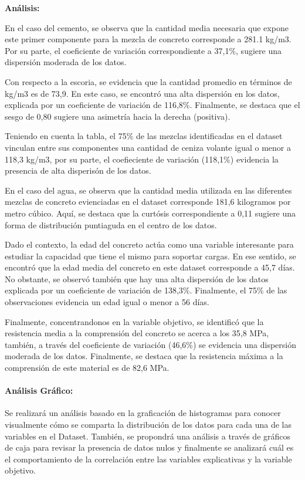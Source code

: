 \documentclass[11pt]{article}
\begin{document}
    \textbf{Análisis:}

En el caso del cemento, se observa que la cantidad media necesaria que
expone este primer componente para la mezcla de concreto corresponde a
281.1 kg/m3. Por su parte, el coeficiente de variación correspondiente a
37,1\%, sugiere una dispersión moderada de los datos.

Con respecto a la escoria, se evidencia que la cantidad promedio en
términos de kg/m3 es de 73,9. En este caso, se encontró una alta
dispersión en los datos, explicada por un coeficiente de variación de
116,8\%. Finalmente, se destaca que el sesgo de 0,80 sugiere una
asimetría hacia la derecha (positiva).

Teniendo en cuenta la tabla, el 75\% de las mezclas identificadas en el
dataset vinculan entre sus componentes una cantidad de ceniza volante
igual o menor a 118,3 kg/m3, por su parte, el coefieciente de variación
(118,1\%) evidencia la presencia de alta disperisón de los datos.

En el caso del agua, se observa que la cantidad media utilizada en las
diferentes mezclas de concreto evienciadas en el dataset corresponde
181,6 kilogramos por metro cúbico. Aquí, se destaca que la curtósis
correspondiente a 0,11 sugiere una forma de distribución puntiaguda en
el centro de los datos.

Dado el contexto, la edad del concreto actúa como una variable
interesante para estudiar la capacidad que tiene el mismo para soportar
cargas. En ese sentido, se encontró que la edad media del concreto en
este dataset corresponde a 45,7 días. No obstante, se observó también
que hay una alta dispersión de los datos explicada por un coeficiente de
variación de 138,3\%. Finalmente, el 75\% de las observaciones evidencia
un edad igual o menor a 56 días.

Finalmente, concentrandonos en la variable objetivo, se identificó que
la resistencia media a la comprensión del concreto se acerca a los 35,8
MPa, también, a través del coeficiente de variación (46,6\%) se
evidencia una dispersión moderada de los datos. Finalmente, se destaca
que la resistencia máxima a la comprensión de este material es de 82,6
MPa.

    \paragraph{Análisis Gráfico:}\label{anuxe1lisis-gruxe1fico}

Se realizará un análisis basado en la graficación de histogramas para
conocer visualmente cómo se comparta la distribución de los datos para
cada una de las variables en el Dataset. También, se propondrá una
análisis a través de gráficos de caja para revisar la presencia de datos
nulos y finalmente se analizará cuál es el comportamiento de la
correlación entre las variables explicativas y la variable objetivo.
\end{document}

